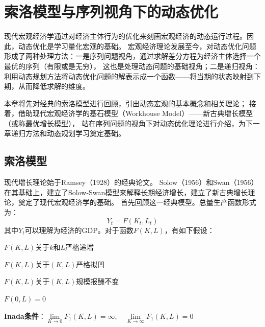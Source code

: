 

\chapter{索洛模型与序列视角下的动态优化} \label{ch-solow-dynamic-opt-sq}

现代宏观经济学通过对经济主体行为的优化来刻画宏观经济的动态运行过程。因此，动态优化是学习量化宏观的基础。
宏观经济理论发展至今，对动态优化问题形成了两种处理方法：一是序列问题视角，通过求解差分方程为经济主体选择一个最优的序列（有限或是无穷），
这也是处理动态问题的基础视角；二是递归视角：利用动态规划方法将动态优化问题的解表示成一个函数——将当期的状态映射到下期，从而降低求解的维度。

本章将先对经典的索洛模型进行回顾，引出动态宏观的基本概念和相关理论；
接着，借助现代宏观经济学的基石模型（Workhouse Model）——新古典增长模型（或称最优增长模型），
站在序列问题的视角下对动态优化理论进行介绍，为下一章递归方法和动态规划学习奠定基础。


\section{索洛模型} \label{sec-solow}

现代增长理论始于Ramsey（1928）的经典论文。
Solow（1956）和Swan（1956）在其基础上，建立了Solow-Swan模型来解释长期经济增长，建立了新古典增长理论，奠定了现代宏观经济学的基础。
首先回顾这一经典模型。总量生产函数形式为：
\begin{equation*}
    Y_t = F\left(K_t, L_t\right)
\end{equation*}
其中$Y_t$可以理解为经济的GDP。对于函数$F(K, L)$，有如下假设：
\begin{assumption}  \label{as-F-increase}
    $F(K, L)$关于$k$和$L$严格递增
\end{assumption}
\begin{assumption}  \label{as-F-quasiconcave}
    $F(K, L)$关于$(K, L)$严格拟凹
\end{assumption}
\begin{assumption}  \label{as-F-cosntant}
    $F(K, L)$关于$(K, L)$规模报酬不变
\end{assumption}
\begin{assumption}  \label{as-F-zero}
    $F(0, L)=0$
\end{assumption}
\begin{assumption}  \label{as-F-inada}
    \textbf{Inada条件}：$\lim\limits_{K\rightarrow 0}F_1(K, L)=\infty, \quad \lim\limits_{K\rightarrow \infty}F_1(K, L)=0$
\end{assumption}

